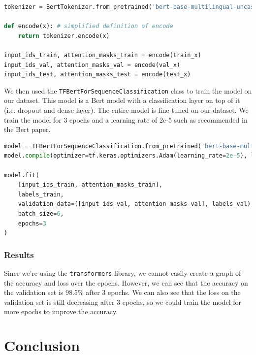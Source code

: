 \documentclass{article}
\begin{document}
    \begin{lstlisting}[language=Python, caption=Tokenizing using Bert]
tokenizer = BertTokenizer.from_pretrained('bert-base-multilingual-uncased')

def encode(x): # simplified definition of encode
    return tokenizer.encode(x)

input_ids_train, attention_masks_train = encode(train_x)
input_ids_val, attention_masks_val = encode(val_x)
input_ids_test, attention_masks_test = encode(test_x)
    \end{lstlisting}

    We then used the \texttt{TFBertForSequenceClassification} class to train the model on our dataset. This model is a Bert model with a classification layer on top of it (i.e. dropout and dense layer). The entire model is fine-tuned on our dataset. We train the model for 3 epochs and a learning rate of 2e-5 such as recommended in the Bert paper\cite{devlin2018bert}.

    \begin{lstlisting}[language=Python, caption=Fine tuning Bert]
model = TFBertForSequenceClassification.from_pretrained('bert-base-multilingual-uncased')
model.compile(optimizer=tf.keras.optimizers.Adam(learning_rate=2e-5), loss=tf.keras.losses.SparseCategoricalCrossentropy(from_logits=True), metrics="accuracy")

model.fit(
    [input_ids_train, attention_masks_train],
    labels_train,
    validation_data=([input_ids_val, attention_masks_val], labels_val),
    batch_size=6,
    epochs=3
)
    \end{lstlisting}

    \subsubsection{Results}

    Since we're using the \texttt{transformers} library, we cannot easily create a graph of the accuracy and loss over the epochs. However, we can see that the accuracy on the validation set is 98.5\% after 3 epochs. We can also see that the loss on the validation set is still decreasing after 3 epochs, so we could train the model for more epochs to improve the accuracy.


    \section{Conclusion}\label{sec:conclusion}
\end{document}
